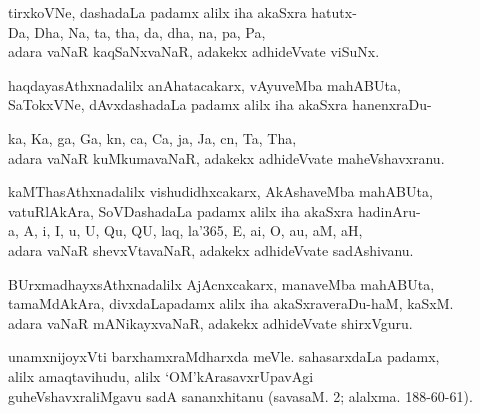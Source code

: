 \begin{entry}
\begin{shl}
tirxkoVNe, dashadaLa padamx alilx iha akaSxra hatutx-\\
Da, Dha, Na, ta, tha, da, dha, na, pa, Pa,\\
adara vaNaR kaqSaNxvaNaR, adakekx adhideVvate viSuNx.
\end{shl}
\smallskip
\begin{shl}
haqdayasAthxnadalilx anAhatacakarx, vAyuveMba mahABUta,\\
SaTokxVNe, dAvxdashadaLa padamx alilx iha akaSxra hanenxraDu-
\end{shl}
\smallskip
\begin{shl}
ka, Ka, ga, Ga, kn, ca, Ca, ja, Ja, cn, Ta, Tha,\\
adara vaNaR kuMkumavaNaR, adakekx adhideVvate maheVshavxranu.
\end{shl}
\smallskip
\begin{shl}
kaMThasAthxnadalilx vishudidhxcakarx, AkAshaveMba mahABUta, \\
vatuRlAkAra, SoVDashadaLa padamx alilx iha akaSxra hadinAru-\\
a, A, i, I, u, U, Qu, QU, laq, la\char'365, E, ai, O, au, aM, aH,\\
adara vaNaR shevxVtavaNaR, adakekx adhideVvate sadAshivanu.
\end{shl}
\smallskip
\begin{shl}
BUrxmadhayxsAthxnadalilx AjAcnxcakarx, manaveMba mahABUta, \\
tamaMdAkAra, divxdaLapadamx alilx iha akaSxraveraDu-haM, kaSxM.\\
adara vaNaR mANikayxvaNaR, adakekx adhideVvate shirxVguru.
\end{shl}
\smallskip
\begin{shl}
unamxnijoyxVti barxhamxraMdharxda meVle. sahasarxdaLa padamx,\\
alilx amaqtavihudu, alilx `OM'kArasavxrUpavAgi\\
guheVshavxraliMgavu sadA sananxhitanu (savasaM. 2; alalxma. 188-60-61).
\end{shl}
\end{entry}



